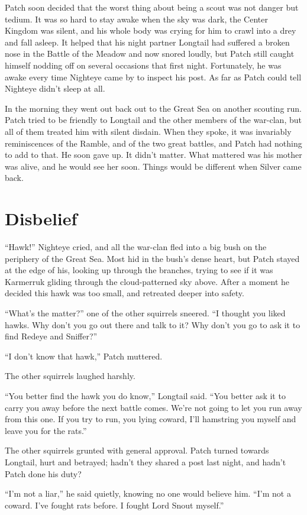 \documentclass[ebook,oneside,openany,17pt]{memoir}
\renewcommand{\thechapter}{\Roman{chapter}}
\newcounter{sections}
\newcommand{\sections}[1]{%
  \section*{#1}
  \addtocounter{sections}{1}%
  \pdfbookmark[1]{#1}{section.\thechapter.\thesections}}
\begin{document}
Patch soon decided that the worst thing about being a scout was not
danger but tedium. It was so hard to stay awake when the sky was dark,
the Center Kingdom was silent, and his whole body was crying for him
to crawl into a drey and fall asleep. It helped that his night partner
Longtail had suffered a broken nose in the Battle of the Meadow and
now snored loudly, but Patch still caught himself nodding off on
several occasions that first night. Fortunately, he was awake every
time Nighteye came by to inspect his post. As far as Patch could tell
Nighteye didn’t sleep at all.

In the morning they went out back out to the Great Sea on another
scouting run. Patch tried to be friendly to Longtail and the other
members of the war-clan, but all of them treated him with silent
disdain. When they spoke, it was invariably reminiscences of the
Ramble, and of the two great battles, and Patch had nothing to add to
that. He soon gave up. It didn’t matter. What mattered was his mother
was alive, and he would see her soon. Things would be different when
Silver came back.


\sections{Disbelief}

“Hawk!” Nighteye cried, and all the war-clan fled into a big bush on
the periphery of the Great Sea. Most hid in the bush’s dense heart,
but Patch stayed at the edge of his, looking up through the branches,
trying to see if it was Karmerruk gliding through the cloud-patterned
sky above. After a moment he decided this hawk was too small, and
retreated deeper into safety.

“What’s the matter?” one of the other squirrels sneered. “I thought
you liked hawks. Why don’t you go out there and talk to it? Why don’t
you go to ask it to find Redeye and Sniffer?”

“I don’t know that hawk,” Patch muttered.

The other squirrels laughed harshly.

“You better find the hawk you do know,” Longtail said. “You better ask
it to carry you away before the next battle comes. We’re not going to
let you run away from this one. If you try to run, you lying coward,
I’ll hamstring you myself and leave you for the rats.”

The other squirrels grunted with general approval. Patch turned
towards Longtail, hurt and betrayed; hadn’t they shared a post last
night, and hadn’t Patch done his duty?

“I’m not a liar,” he said quietly, knowing no one would believe
him. “I’m not a coward. I’ve fought rats before. I fought Lord Snout
myself.”
\end{document}
